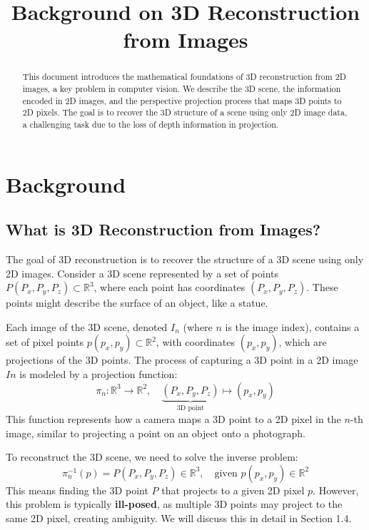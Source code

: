 \documentclass{article}
\title{Background on 3D Reconstruction from Images}
\author{}
\date{}
\begin{document}
\maketitle

\begin{abstract}
This document introduces the mathematical foundations of 3D reconstruction from 2D images, a key problem in computer vision. We describe the 3D scene, the information encoded in 2D images, and the perspective projection process that maps 3D points to 2D pixels. The goal is to recover the 3D structure of a scene using only 2D image data, a challenging task due to the loss of depth information in projection.
\end{abstract}

\section{Background}

\subsection{What is 3D Reconstruction from Images?}

The goal of 3D reconstruction is to recover the structure of a 3D scene using only 2D images. Consider a 3D scene represented by a set of points \( P(P_x, P_y, P_z) \subset \mathbb{R}^3 \), where each point has coordinates \( (P_x, P_y, P_z) \). These points might describe the surface of an object, like a statue.

Each image of the 3D scene, denoted \( I_n \) (where \( n \) is the image index), contains a set of pixel points \( p(p_x, p_y) \subset \mathbb{R}^2 \), with coordinates \( (p_x, p_y) \), which are projections of the 3D points. The process of capturing a 3D point in a 2D image \( I n \) is modeled by a projection function:
\[
\pi_n: \mathbb{R}^3 \to \mathbb{R}^2, \quad \underbrace{(P_x, P_y, P_z)}_{\text{3D point}} \mapsto (p_x, p_y)
\]
This function represents how a camera maps a 3D point to a 2D pixel in the \( n \)-th image, similar to projecting a point on an object onto a photograph.

To reconstruct the 3D scene, we need to solve the inverse problem:
\[
\pi_n^{-1}(p) = P(P_x, P_y, P_z) \in \mathbb{R}^3, \quad \text{given } p(p_x, p_y) \in \mathbb{R}^2
\]
This means finding the 3D point \( P \) that projects to a given 2D pixel \( p \). However, this problem is typically \textbf{ill-posed}, as multiple 3D points may project to the same 2D pixel, creating ambiguity. We will discuss this in detail in Section 1.4.
\end{document}
